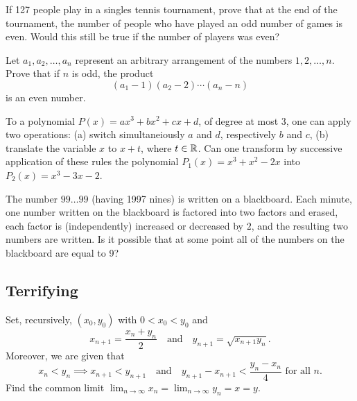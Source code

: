\documentclass{article}
\begin{document}
    \begin{exercise}
        If 127 people play in a singles tennis tournament, prove that at the end of the tournament, the number of people who have played an odd number of games is even. Would this still be true if the number of players was even?
    \end{exercise}

    \begin{exercise}
        Let \(a_1,a_2,\ldots,a_n\) represent an arbitrary arrangement of the numbers \(1,2,\ldots,n\). Prove that if \(n\) is odd, the product
        \[(a_1-1)(a_2-2)\cdots(a_n-n)\]
        is an even number.
    \end{exercise}

    \begin{exercise}
        To a polynomial \(P(x)=ax^3+bx^2+cx+d\), of degree at most 3, one can apply two operations: (a) switch simultaneiously \(a\) and \(d\), respectively \(b\) and \(c\), (b) translate the variable \(x\) to \(x+t\), where \(t\in\mathbb{R}\). Can one transform by successive application of these rules the polynomial \(P_1(x)=x^3+x^2-2x\) into \(P_2(x)=x^3-3x-2\). 
    \end{exercise}

    \begin{exercise}
        The number \(99\ldots99\) (having 1997 nines) is written on a blackboard. Each minute, one number written on the blackboard is factored into two factors and erased, each factor is (independently) increased or decreased by \(2\), and the resulting two numbers are written. Is it possible that at some point all of the numbers on the blackboard are equal to 9?
    \end{exercise}

\subsection*{Terrifying}

    \begin{exercise}
        Set, recursively, \((x_0,y_0)\) with \(0<x_0<y_0\) and
        \[x_{n+1}=\frac{x_n+y_n}{2}\quad\text{and}\quad y_{n+1}=\sqrt{x_{n+1}y_n}.\]
        Moreover, we are given that
        \[x_n<y_n\implies x_{n+1}<y_{n+1}\quad\text{and}\quad y_{n+1}-x_{n+1}<\frac{y_n-x_n}{4}\text{ for all }n.\]
        Find the common limit \(\displaystyle\lim_{n\to\infty}x_n=\lim_{n\to\infty}y_n=x=y\).
    \end{exercise}
\end{document}
